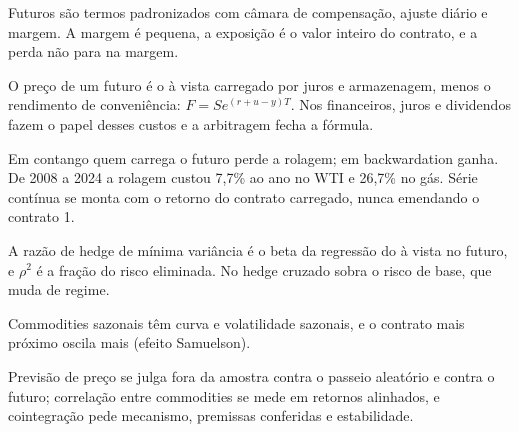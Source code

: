 \begin{resumo}
  \item Futuros são termos padronizados com câmara de compensação, ajuste diário e margem. A margem é pequena, a exposição é o valor inteiro do contrato, e a perda não para na margem.
  \item O preço de um futuro é o à vista carregado por juros e armazenagem, menos o rendimento de conveniência: $F = S e^{(r+u-y)T}$. Nos financeiros, juros e dividendos fazem o papel desses custos e a arbitragem fecha a fórmula.
  \item Em contango quem carrega o futuro perde a rolagem; em backwardation ganha. De 2008 a 2024 a rolagem custou 7,7\% ao ano no WTI e 26,7\% no gás. Série contínua se monta com o retorno do contrato carregado, nunca emendando o contrato 1.
  \item A razão de hedge de mínima variância é o beta da regressão do à vista no futuro, e $\rho^2$ é a fração do risco eliminada. No hedge cruzado sobra o risco de base, que muda de regime.
  \item Commodities sazonais têm curva e volatilidade sazonais, e o contrato mais próximo oscila mais (efeito Samuelson).
  \item Previsão de preço se julga fora da amostra contra o passeio aleatório e contra o futuro; correlação entre commodities se mede em retornos alinhados, e cointegração pede mecanismo, premissas conferidas e estabilidade.
\end{resumo}

